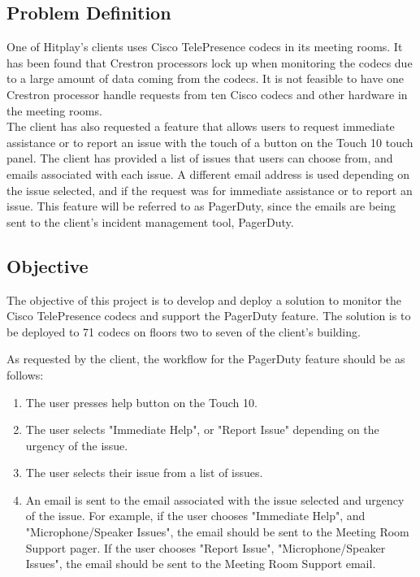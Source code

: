 \documentclass[letterpaper,12pt]{article}
\begin{document}
\subsection{Problem Definition}
One of Hitplay's clients uses Cisco TelePresence codecs in its meeting rooms. It has been found that Crestron processors lock up when monitoring the codecs due to a large amount of data coming from the codecs. It is not feasible to have one Crestron processor handle requests from ten Cisco codecs and other hardware in the meeting rooms.\\

The client has also requested a feature that allows users to request immediate assistance or to report an issue with the touch of a button on the Touch 10 touch panel. The client has provided a list of issues that users can choose from, and emails associated with each issue. A different email address is used depending on the issue selected, and if the request was for immediate assistance or to report an issue. This feature will be referred to as PagerDuty, since the emails are being sent to the client's incident management tool, PagerDuty.

\subsection{Objective}
The objective of this project is to develop and deploy a solution to monitor the Cisco TelePresence codecs and support the PagerDuty feature. The solution is to be deployed to 71 codecs on floors two to seven of the client's building.

As requested by the client, the workflow for the PagerDuty feature should be as follows:
\begin{enumerate}
\item The user presses help button on the Touch 10.
\item The user selects "Immediate Help", or "Report Issue" depending on the urgency of the issue.
\item The user selects their issue from a list of issues.
\item An email is sent to the email associated with the issue selected and urgency of the issue. For example, if the user chooses "Immediate Help", and "Microphone/Speaker Issues", the email should be sent to the Meeting Room Support pager. If the user chooses "Report Issue", "Microphone/Speaker Issues", the email should be sent to the Meeting Room Support email.
\end{enumerate}
\end{document}
